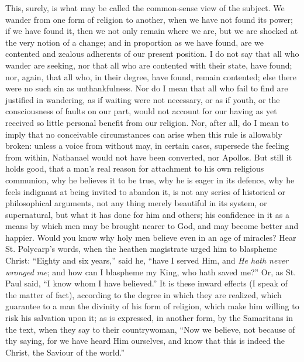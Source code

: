This, surely, is what may be called the common-sense view of the
subject. We wander from one form of religion to another, when we have
not found its power; if we have found it, then we not only remain
where we are, but we are shocked at the very notion of a change; and
in proportion as we have found, are we contented and zealous adherents
of our present position. I do not say that all who wander are seeking,
nor that all who are contented with their state, have found; nor,
again, that all who, in their degree, have found, remain contented;
else there were no such sin as unthankfulness. Nor do I mean that all
who fail to find are justified in wandering, as if waiting were not
necessary, or as if youth, or the consciousness of faults on our part,
would not account for our having as yet received so little personal
benefit from our religion. Nor, after all, do I mean to imply that no
conceivable circumstances can arise when this rule is allowably
broken: unless a voice from without may, in certain cases, supersede
the feeling from within, Nathanael would not have been converted, nor
Apollos. But still it holds good, that a man's real reason for
attachment to his own religious communion, why he believes it to be
true, why he is eager in its defence, why he feels indignant at being
invited to abandon it, is not any series of historical or
philosophical arguments, not any thing merely beautiful in its system,
or supernatural, but what it has done for him and others; his
confidence in it as a means by which men may be brought nearer to God,
and may become better and happier. Would you know why holy men believe
even in an age of miracles? Hear St. Polycarp's words, when the
heathen magistrate urged him to blaspheme Christ: ``Eighty and six
years,'' said he, ``have I served Him, and \emph{He hath never
wronged me}; and how can I blaspheme my King, who hath saved
me?'' Or, as St. Paul said, ``I know whom I have
believed.'' It is these inward effects (I speak of the matter of
fact), according to the degree in which they are realized, which
guarantee to a man the divinity of his form of religion, which make
him willing to risk his salvation upon it; as is expressed, in another
form, by the Samaritans in the text, when they say to their
countrywoman, ``Now we believe, not because of thy saying, for we
have heard Him ourselves, and know that this is indeed the Christ, the
Saviour of the world.''

